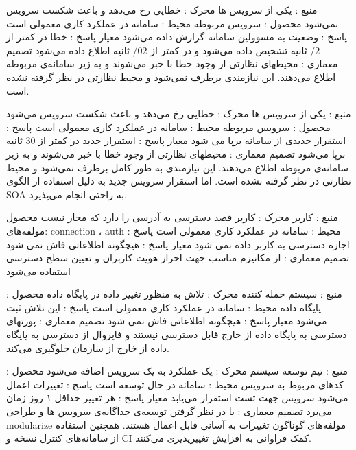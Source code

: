 \begin{itemize}
 منبع : یکی از سرویس ها
 محرک : خطایی رخ می‌دهد و باعث شکست سرویس نمی‌شود
 محصول : سرویس مربوطه 
 محیط : سامانه در عملکرد کاری معمولی است
 پاسخ : وضعیت به مسوولین سامانه گزارش داده می‌شود
 معیار پاسخ : خطا در کمتر از $/2 $   ثانیه تشخیص داده می‌شود و در کمتر از  $/02 $ ثانیه اطلاع داده می‌شود
 تصمیم معماری : محیطهای نظارتی از وجود خطا با خبر می‌شوند و به زیر سامانه‌ی مربوطه اطلاع می‌دهند. این نیازمندی برطرف نمی‌شود و محیط نظارتی در نظر گرفته نشده است. 
\end{itemize}
\begin{itemize}
 منبع : یکی از سرویس ها
 محرک : خطایی رخ می‌دهد و باعث شکست سرویس می‌شود
 محصول : سرویس مربوطه 
 محیط : سامانه در عملکرد کاری معمولی است
 پاسخ : استقرار جدیدی از سامانه برپا می شود
 معیار پاسخ : استقرار جدید در کمتر از 30 ثانیه برپا می‌شود
 تصمیم معماری : محیطهای نظارتی از وجود خطا با خبر می‌شوند و به زیر سامانه‌ی مربوطه اطلاع می‌دهند. این نیازمندی به طور کامل برطرف نمی‌شود و محیط نظارتی در نظر گرفته نشده است. اما استقرار سرویس جدید به دلیل استفاده از الگوی SOA به راحتی انجام می‌پذیرد.
\end{itemize}

\begin{itemize}
 منبع : کاربر 
 محرک : کاربر قصد دسترسی به آدرسی را دارد که مجاز نیست
 محصول :مولفه‌های connection ، auth 
 محیط : سامانه در عملکرد کاری معمولی است
 پاسخ : اجازه دسترسی به کاربر داده نمی شود
 معیار پاسخ : هیچگونه اطلاعاتی فاش نمی شود
 تصمیم معماری : از مکانیزم مناسب جهت احراز هویت کاربران و تعیین سطح دسترسی استفاده می‌شود
\end{itemize}


\begin{itemize}
 منبع : سیستم حمله کننده 
 محرک : تلاش به منظور تغییر داده در پایگاه داده
 محصول : پایگاه داده
 محیط : سامانه در عملکرد کاری معمولی است
 پاسخ : این تلاش ثبت می‌شود
 معیار پاسخ : هیچگونه اطلاعاتی فاش نمی شود
 تصمیم معماری : پورتهای دسترسی به پایگاه داده از خارج قابل دسترسی نیستند و فایروال از دسترسی به پایگاه داده از خارج از سازمان جلوگیری می‌کند. 
\end{itemize}


\begin{itemize}
 منبع : تیم توسعه سیستم 
 محرک : یک عملکرد به یک سرویس  اضافه می‌شود	
 محصول : کدهای مربوط به سرویس
 محیط : سامانه در حال توسعه است
 پاسخ : تغییرات اعمال می‌شود سرویس جهت تست استقرار می‌یابد
 معیار پاسخ : هر تغییر حداقل ۱ روز زمان می‌برد
 تصمیم معماری : با در نظر گرفتن توسعه‌ی جداگانه‌ی سرویس ها و طراحی modularize مولفه‌های گوناگون تغییرات به آسانی قابل اعمال هستند. همچنین استفاده از سامانه‌های کنترل نسخه و CI کمک فراوانی به افزایش تغییرپذیری می‌کنند. 
\end{itemize}


